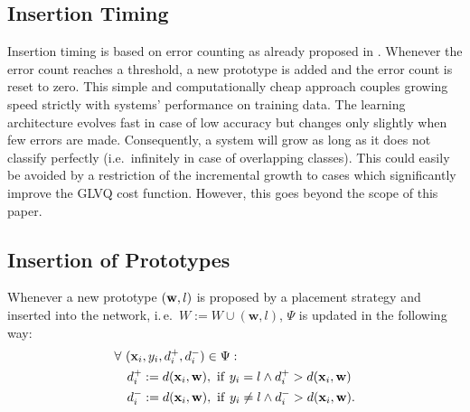 \documentclass[conference]{IEEEtran}
\begin{document}
\subsection{Insertion Timing}
Insertion timing is based on error counting as already proposed in \cite{PN0805}.
Whenever the error count reaches a threshold, a new prototype is added and the error count is reset to zero. 
This simple and computationally cheap approach couples growing speed strictly with systems' performance on training data. 
The learning architecture evolves fast in case of low accuracy but changes
only slightly when few errors are made. Consequently, a system will grow as long as it does not classify perfectly (i.e.\ infinitely in case of overlapping classes). 
This could easily be avoided by a restriction of
the incremental growth to cases which significantly improve
the GLVQ cost function. However, this
goes beyond the scope of this paper.

\subsection{Insertion of Prototypes}
Whenever a new prototype $(\mathbf{w},l)$ is proposed by a placement strategy and inserted into the network, i.\,e.\ ${W}:= W \cup (\mathbf{w},l)$, $\Psi$ is updated in the following way:\\
\begin{equation}\label{eq:PSIUpdate}
\begin{align*}
&\forall\ (\mathbf{x}_i,y_i,d^+_i,d^-_i)  \in \Psi: \\
&\ \ \ d^+_i := d(\x_i,\w), \ \mathrm{if}\ y_i=l \land d^+_i > d(\x_i,\w)\\
&\ \ \ d^-_i := d(\x_i,\w), \ \mathrm{if}\ y_i\neq l \land d^-_i > d(\x_i,\w).
\end{align*}
\end{equation}
\end{document}
